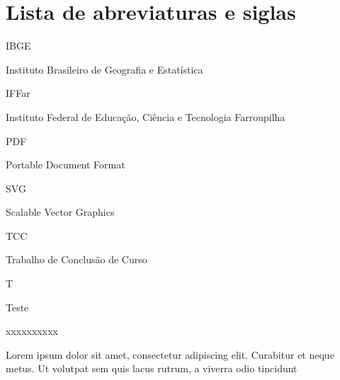 \newcommand\siglaLargura{10ex} %
\newcommand\siglaGap{1ex} %
\newcommand\nomeSiglaLargura{\dimexpr\linewidth-\siglaLargura-\siglaGap\relax}
\newcommand\sigla[2]{\noindent\parbox[t]{\siglaLargura}{#1\strut}%
  \hspace{\siglaGap}%
  \parbox[t]{\nomeSiglaLargura}{#2\strut}}

\chapter*{Lista de abreviaturas e siglas}


\sigla{IBGE}{Instituto Brasileiro de Geografia e Estatística}

\sigla{IFFar}{Instituto Federal de Educação, Ciência e Tecnologia Farroupilha}

\sigla{PDF}{Portable Document Format}

\sigla{SVG}{Scalable Vector Graphics}

\sigla{TCC}{Trabalho de Conclusão de Curso}

\sigla{T}{Teste}

\sigla{xxxxxxxxxx}{Lorem ipsum dolor sit amet, consectetur adipiscing elit. Curabitur et neque metus. Ut volutpat sem quis lacus rutrum, a viverra odio tincidunt}

\OnesideTwoside{\clearpage}{\cleardoublepage}